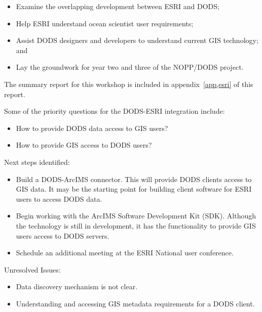 \documentclass{report}
\begin{document}
\begin{itemize}
\item Examine the overlapping development between ESRI and DODS;
\item Help ESRI understand ocean scientist user requirements;
\item Assist DODS designers and developers to understand current GIS
  technology; and
\item Lay the groundwork for year two and three of the NOPP/DODS project.
\end{itemize}

The summary report for this workshop is included in
appendix~\ref{app,esri} of this report. 

Some of the priority questions for the DODS-ESRI integration include:

\begin{itemize}
\item How to provide DODS data access to GIS users?
\item How to provide GIS access to DODS users?
\end{itemize}

Next steps identified:

\begin{itemize}
\item Build a DODS-ArcIMS connector.  This will provide DODS clients
  access to GIS data.  It may be the starting point for building
  client software for ESRI users to access DODS data.
\item Begin working with the ArcIMS Software Development Kit (SDK).
  Although the technology is still in development, it has the
  functionality to provide GIS users access to DODS servers.
\item Schedule an additional meeting at the ESRI National user
  conference.
\end{itemize}

Unresolved Issues:
\begin{itemize}
\item Data discovery mechanism is not clear.
\item Understanding and accessing GIS metadata requirements for a DODS
  client.
\end{itemize}

\begin{comment}
\texorhtml{}{
\chapter{Appendices}

The appendices to this report are linked below:

\begin{tabular}[t]{ll}
Appendix I: &  \xlink{Gulf Coast}{appI.txt} \\
Appendix II: &  \xlink{ESRI}{appII.txt} \\
Appendix III: &  \xlink{Southeast}{appIII.txt} \\
Appendix IV: &  \xlink{Northeast}{appIV.txt} \\
Appendix V: &  \xlink{West Coast}{appV.txt} \\
\end{tabular}
}
\end{comment}
\end{document}
